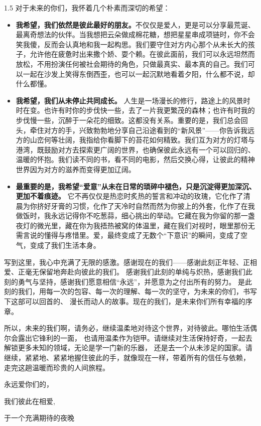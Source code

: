 \begin{spacing}{1.5}
    对于未来的你们，我怀着几个朴素而深切的希望：

    \begin{itemize}[label=\textcolor{toc-help}{$\ast$}]
        \item \textbf{我希望，我们依然是彼此最好的朋友。}不仅仅是爱人，更是可以分享最荒诞、最离奇想法的伙伴。当我想把云朵做成棉花糖，想把星星串成项链时，你不会笑我傻，反而会认真地和我一起构思。我们要守住对方内心那个从未长大的孩子，允许他在疲惫时出来撒个娇、耍个赖。在彼此面前，我们可以永远坦然而放松，不用扮演任何被社会期待的角色，只做最真实、最本真的自己。我们可以一起在沙发上笑得东倒西歪，也可以一起沉默地看着夕阳，什么都不说，却什么都懂。
        \item  \textbf{我希望，我们从未停止共同成长。} 人生是一场漫长的修行，路途上的风景时时在变。也许有时你的步伐快一些，去了一片我更繁茂的森林；也许有时我的步伐慢一些，沉醉于一朵花的细致。这都没有关系。重要的是，我们总会回头，牵住对方的手，兴致勃勃地分享自己沿途看到的“新风景”——你告诉我远方的山峦何等壮阔，我指给你看脚下的苔花如何精致。我们互为对方的灯塔与港湾，既鼓励对方去探索更广阔的世界，也确保彼此永远有一个可以回归的、温暖的怀抱。我们读不同的书，看不同的电影，然后交换心得，让彼此的精神世界因为对方的滋养而变得更加辽阔。 
        \item  \textbf{最重要的是，我希望“爱意”从未在日常的琐碎中褪色，只是沉淀得更加深沉、更加不着痕迹。} 它不再仅仅是热恋时炙热的誓言和冲动的玫瑰，它化作了清晨为你挤好牙膏的习惯，化作了天冷时自然而然为你披上的外套，化作了在我做饭时，我永远记得你不吃葱蒜，细心挑出的举动。它藏在我为你留的那一盏夜灯的微光里，藏在你为我捂热被窝的体温里，藏在我们对视时，眼里那份无需言说的懂得与疼惜里。爱，最终变成了无数个“下意识”的瞬间，变成了空气，变成了我们生活本身。
    \end{itemize}

    写到这里，我心中充满了无限的感激。感谢现在的我们——感谢此刻正年轻、正相爱、正毫无保留地奔赴向彼此的我们。
    感谢我们此刻的单纯与炽热，感谢我们此刻的勇气与坚持，感谢我们愿意相信“永远”，并愿意为之付出所有的努力。
    是此刻的我们，用每一次的包容、每一次的理解、每一次的坚守，为未来的你们，书写下这部可以回首的、
    漫长而动人的故事。现在的我们，是未来你们所有幸福的序章。

    所以，未来的我们啊，请务必，继续温柔地对待这个世界，对待彼此。哪怕生活偶尔会露出它锋利的一面，
    也请用温柔作为铠甲。请继续对生活保持好奇，一起去解锁更多未知的领域，无论是学一门新的乐器，
    还是去一个从未涉足的国家。请继续，紧紧地、紧紧地握住彼此的手，就像现在一样，带着所有的信任与依赖，
    走完这趟温暖而珍贵的人间旅程。

    \vspace*{1cm}

    \hfill 永远爱你们的，

    \hfill 我们彼此在相爱,
    
    \hfill 于一个充满期待的夜晚

\end{spacing}

